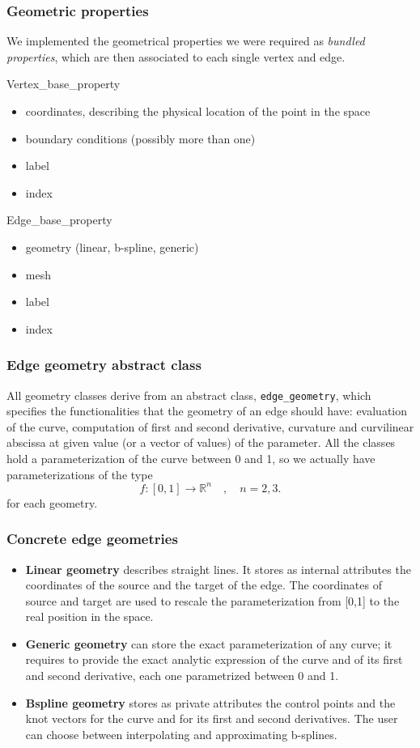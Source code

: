 \documentclass[11pt]{beamer}
\begin{document}
	\begin{frame}
		\frametitle{Geometric properties}
		We implemented the geometrical properties we were required as \textit{bundled properties}, which are then associated to each single vertex and edge.
		\begin{block}{Vertex\_base\_property}
			\begin{itemize}
				\item coordinates, describing the physical location of the point in the space
				\item boundary conditions (possibly more than one)
				\item label
				\item index
			\end{itemize}
		\end{block}
		\begin{block}{Edge\_base\_property}
			\begin{itemize}
				\item geometry (linear, b-spline, generic)
				\item mesh
				\item label
				\item index
			\end{itemize}
		\end{block}		
	\end{frame}
	\begin{frame}
		\frametitle{Edge geometry abstract class}
		All geometry classes derive from an abstract class, \texttt{edge\_geometry}, which specifies the functionalities that the geometry of an edge should have: evaluation of the curve, computation of first and second derivative, curvature and curvilinear abscissa at given value (or a vector of values) of the parameter. All the classes hold a parameterization of the curve between 0 and 1, so we actually have parameterizations of the type
		\begin{equation*}
		f:[0,1]\rightarrow\mathbb{R}^{n} \quad, \quad n=2,3.
		\end{equation*}
		for each geometry.
	\end{frame}
	\begin{frame}
		\frametitle{Concrete edge geometries}
		\begin{itemize}
			\item \textbf{Linear geometry} describes straight lines. It stores as internal attributes the coordinates of the source and the target of the edge. The coordinates of source and target are used to rescale the parameterization from [0,1] to the real position in the space. 
			\item \textbf{Generic geometry} can store the exact parameterization of any curve; it requires to provide the exact analytic expression of the curve and of its first and second derivative, each one parametrized between 0 and 1.
			\item \textbf{Bspline geometry} stores as private attributes the control points and the knot vectors for the curve and for its first and second derivatives.	
			The user can choose between interpolating and approximating b-splines.
		\end{itemize}
	\end{frame}
\end{document}
